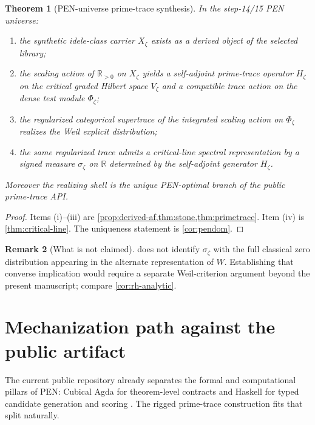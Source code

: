 \documentclass[11pt,a4paper]{article}
\theoremstyle{plain}
\newtheorem{theorem}{Theorem}[section]
\theoremstyle{definition}
\newtheorem{remark}[theorem]{Remark}
\newcommand{\R}{\mathbb{R}}
\begin{document}
\begin{theorem}[PEN-universe prime-trace synthesis]
\label{thm:final}
In the step-14/15 PEN universe:
\begin{enumerate}[label=(\roman*),nosep]
  \item the synthetic idele-class carrier $X_{\zeta}$ exists as a derived object of the selected library;
  \item the scaling action of $\R_{>0}$ on $X_{\zeta}$ yields a self-adjoint prime-trace operator $H_{\zeta}$ on the critical graded Hilbert space $V_{\zeta}$ and a compatible trace action on the dense test module $\Phi_{\zeta}$;
  \item the regularized categorical supertrace of the integrated scaling action on $\Phi_{\zeta}$ realizes the Weil explicit distribution;
  \item the same regularized trace admits a critical-line spectral representation by a signed measure $\sigma_{\zeta}$ on $\R$ determined by the self-adjoint generator $H_{\zeta}$.
\end{enumerate}
Moreover the realizing shell is the unique PEN-optimal branch of the public prime-trace API.
\end{theorem}

\begin{proof}
Items (i)--(iii) are \cref{prop:derived-af,thm:stone,thm:primetrace}. Item (iv) is \cref{thm:critical-line}. The uniqueness statement is \cref{cor:pendom}.
\end{proof}

\begin{remark}[What is not claimed]
\label{rem:not-claimed}
 does not identify $\sigma_{\zeta}$ with the full classical zero distribution appearing in the alternate representation of $W$. Establishing that converse implication would require a separate Weil-criterion argument beyond the present manuscript; compare \cref{cor:rh-analytic}.
\end{remark}

\section{Mechanization path against the public artifact}

The current public repository already separates the formal and computational pillars of PEN: Cubical Agda for theorem-level contracts and Haskell for typed candidate generation and scoring \citep{lande-repo,lande-arch}. The rigged prime-trace construction fits that split naturally.
\end{document}

